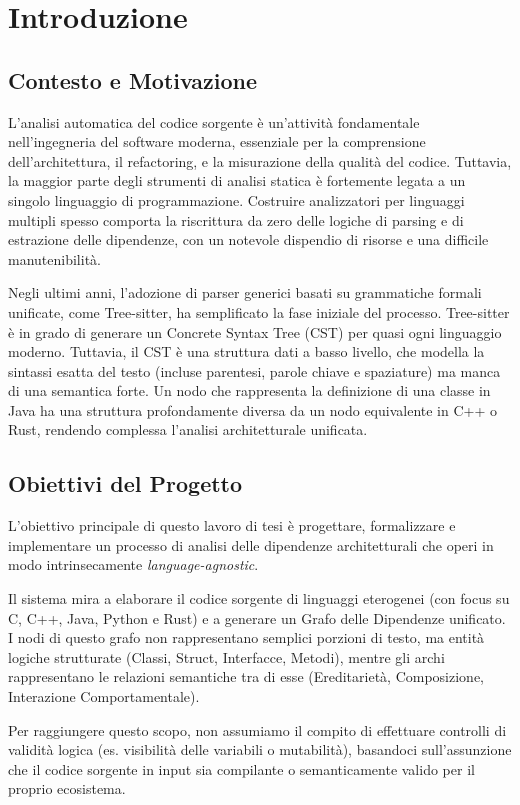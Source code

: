 \chapter{Introduzione}

\section{Contesto e Motivazione}
L'analisi automatica del codice sorgente è un'attività fondamentale
nell'ingegneria del software moderna, essenziale per la comprensione
dell'architettura, il refactoring, e la misurazione della qualità del
codice. Tuttavia, la maggior parte degli strumenti di analisi statica
è fortemente legata a un singolo linguaggio di programmazione.
Costruire analizzatori per linguaggi multipli spesso comporta la
riscrittura da zero delle logiche di parsing e di estrazione delle
dipendenze, con un notevole dispendio di risorse e una difficile manutenibilità.

Negli ultimi anni, l'adozione di parser generici basati su
grammatiche formali unificate, come Tree-sitter, ha semplificato la
fase iniziale del processo. Tree-sitter è in grado di generare un
Concrete Syntax Tree (CST) per quasi ogni linguaggio moderno.
Tuttavia, il CST è una struttura dati a basso livello, che modella la
sintassi esatta del testo (incluse parentesi, parole chiave e
spaziature) ma manca di una semantica forte. Un nodo che rappresenta
la definizione di una classe in Java ha una struttura profondamente
diversa da un nodo equivalente in C++ o Rust, rendendo complessa
l'analisi architetturale unificata.

\section{Obiettivi del Progetto}
L'obiettivo principale di questo lavoro di tesi è progettare,
formalizzare e implementare un processo di analisi delle dipendenze
architetturali che operi in modo intrinsecamente \textit{language-agnostic}.

Il sistema mira a elaborare il codice sorgente di linguaggi
eterogenei (con focus su C, C++, Java, Python e Rust) e a generare un
Grafo delle Dipendenze unificato. I nodi di questo grafo non
rappresentano semplici porzioni di testo, ma entità logiche
strutturate (Classi, Struct, Interfacce, Metodi), mentre gli archi
rappresentano le relazioni semantiche tra di esse (Ereditarietà,
Composizione, Interazione Comportamentale).

Per raggiungere questo scopo, non assumiamo il compito di effettuare
controlli di validità logica (es. visibilità delle variabili o
mutabilità), basandoci sull'assunzione che il codice sorgente in
input sia compilante o semanticamente valido per il proprio ecosistema.

